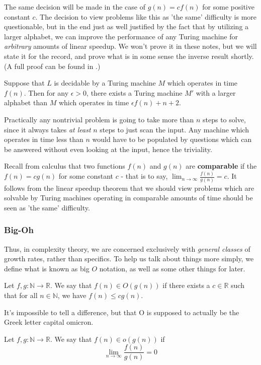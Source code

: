 The same decision will be made in the case of $g(n) = cf(n)$ for some positive constant $c$. The decision to view problems like this as 'the same' difficulty is more questionable, but in the end just as well justified by the fact that by utilizing a larger alphabet, we can improve the performance of any Turing machine for \textit{arbitrary} amounts of linear speedup. We won't prove it in these notes, but we will state it for the record, and prove what is in some sense the inverse result shortly. (A full proof can be found in \cite{papadimitriouComputationalComplexity1994}.)

\begin{theorem}
	Suppose that $L$ is decidable by a Turing machine $M$ which operates in time $f(n)$. Then for any $\epsilon > 0$, there exists a Turing machine $M'$ with a larger alphabet than $M$ which operates in time $\epsilon f(n)+n+2$.
\end{theorem}
Practically any nontrivial problem is going to take more than $n$ steps to solve, since it always takes \textit{at least} $n$ steps to just scan the input. Any machine which operates in time less than $n$ would have to be populated by questions which can be answered without even looking at the input, hence the triviality.

Recall from calculus that two functions $f(n)$ and $g(n)$ are \textbf{comparable} if  the $f(n) = cg(n)$ for some constant $c$ - that is to say, $\lim_{n \to \infty} \frac{f(n)}{g(n)} = c$. It follows from the linear speedup theorem that we should view problems which are solvable by Turing machines operating in comparable amounts of time should be seen as 'the same' difficulty.

\subsubsection{Big-Oh}

Thus, in complexity theory, we are concerned exclusively with \textit{general classes} of growth rates, rather than specifics. To help us talk about things more simply, we define what is known as big $O$ notation, as well as some other things for later.
\begin{definition}[Big O]
Let $f,g:\mathbb{N} \to \mathbb{R}$. We say that \textbf{$f(n) \in O(g(n))$} if there exists a $c \in \mathbb{R}$ such that for all $n \in \mathbb{N}$, we have $f(n) \leq cg(n)$. 
\end{definition}
It's impossible to tell a difference, but that O is supposed to actually be the Greek letter capital omicron.
\begin{definition}[Little o]
	Let $f,g:\mathbb{N} \to \mathbb{R}$. We say that $f(n) \in o(g(n))$ if 
	\[\lim_{n \to \infty}\frac{f(n)}{g(n)} = 0 \]
\end{definition}

